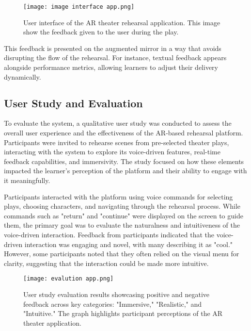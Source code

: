 \begin{figure}[h!]
    \centering
    \texttt{[image: image interface app.png]}
    \caption{User interface of the AR theater rehearsal application. This image show the feedback given to the user during the play.}
    \vspace{0.1cm}
    \label{fig:app_interface}
\end{figure}

This feedback is presented on the augmented mirror in a way that avoids disrupting the flow of the rehearsal. For instance, textual feedback appears alongside performance metrics, allowing learners to adjust their delivery dynamically.

\subsection{User Study and Evaluation}

To evaluate the system, a qualitative user study was conducted to assess the overall user experience and the effectiveness of the AR-based rehearsal platform. Participants were invited to rehearse scenes from pre-selected theater plays, interacting with the system to explore its voice-driven features, real-time feedback capabilities, and immersivity. The study focused on how these elements impacted the learner's perception of the platform and their ability to engage with it meaningfully.

Participants interacted with the platform using voice commands for selecting plays, choosing characters, and navigating through the rehearsal process. While commands such as "return" and "continue" were displayed on the screen to guide them, the primary goal was to evaluate the naturalness and intuitiveness of the voice-driven interaction. Feedback from participants indicated that the voice-driven interaction was engaging and novel, with many describing it as "cool." However, some participants noted that they often relied on the visual menu for clarity, suggesting that the interaction could be made more intuitive.

\begin{figure}[h!]
    \centering
    \texttt{[image: evalution app.png]}
    \caption{User study evaluation results showcasing positive and negative feedback across key categories: "Immersive," "Realistic," and "Intuitive." The graph highlights participant perceptions of the AR theater application.}
    \vspace{0.1cm}
    \label{fig:evalution_app}
\end{figure}


